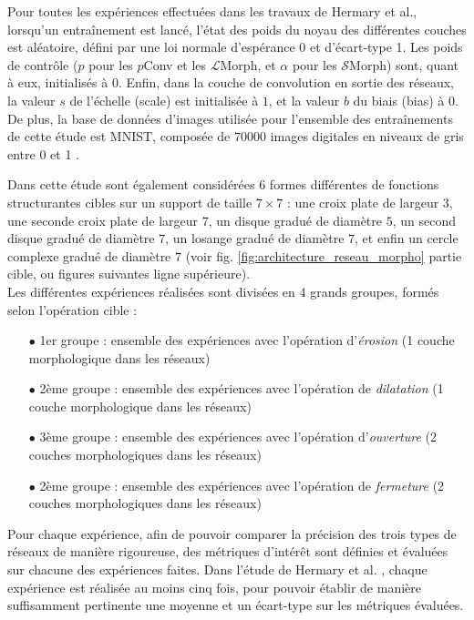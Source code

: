 \vspace{-1.4mm}
Pour toutes les expériences effectuées dans les travaux de Hermary et al., lorsqu'un entraînement est lancé, l'état des poids du noyau des différentes couches est aléatoire, défini par une loi normale d'espérance 0 et d'écart-type 1. Les poids de contrôle ($p$ pour les $p$Conv et les $\mathcal{L}$Morph, et $\alpha$ pour les $\mathcal{S}$Morph) sont, quant à eux, initialisés à $0$. Enfin, dans la couche de convolution en sortie des réseaux, la valeur $s$ de l'échelle (scale) est initialisée à $1$, et la valeur $b$ du biais (bias) à $0$. 
De plus, la base de données d'images utilisée pour l'ensemble des entraînements de cette étude est MNIST, composée de $70000$ images digitales en niveaux de gris entre 0 et 1 \cite{LeCun_2005}.


\newpage

Dans cette étude sont également considérées 6 formes différentes de fonctions structurantes cibles sur un support de taille $7 \times 7$ : une croix plate de largeur $3$, une seconde croix plate de largeur $7$, un disque gradué de diamètre $5$, un second disque gradué de diamètre $7$, un losange gradué de diamètre $7$, et enfin un cercle complexe gradué de diamètre $7$ (voir fig. \ref{fig:architecture_reseau_morpho} partie cible, ou figures suivantes ligne supérieure). \\

\vspace{-1.6mm}
Les différentes expériences réalisées sont divisées en 4 grands groupes, formés selon l'opération cible : 

\vspace{0.4mm}
\begin{itemize}%
    \item[$\bullet$] 1er groupe : ensemble des expériences avec l'opération d'\textit{érosion} (1 couche morphologique dans les réseaux)
    \item[$\bullet$] 2ème groupe : ensemble des expériences avec l'opération de \textit{dilatation} (1 couche morphologique dans les réseaux)
    \item[$\bullet$] 3ème groupe : ensemble des expériences avec l'opération d'\textit{ouverture} (2 couches morphologiques dans les réseaux)
    \item[$\bullet$] 2ème groupe :  ensemble des expériences avec l'opération de \textit{fermeture} (2 couches morphologiques dans les réseaux)
\end{itemize}

\vspace{2.0mm}
Pour chaque expérience, afin de pouvoir comparer la précision des trois types de réseaux de manière rigoureuse, des métriques d'intérêt sont définies et évaluées sur chacune des expériences faites. Dans l'étude de Hermary et al. \cite{Hermary_2022}, chaque expérience est réalisée au moins cinq fois, pour pouvoir établir de manière suffisamment pertinente une moyenne et un écart-type sur les métriques évaluées. \\

